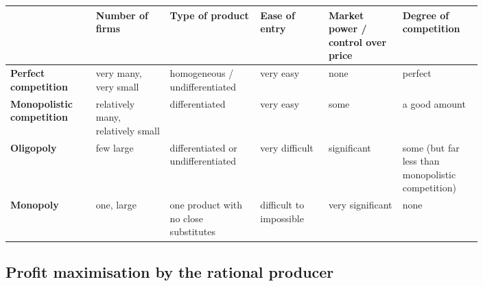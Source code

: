 \documentclass[a4paper,12pt]{article}
\begin{document}
\begin{center}
\renewcommand{\arraystretch}{1.6}
\begin{tabular}{|p{0.14\linewidth}|p{0.13\linewidth}|p{0.15\linewidth}|p{0.12\linewidth}|p{0.13\linewidth}|p{0.13\linewidth}|}
\hline
 & \textbf{Number of firms} & \textbf{Type of product} & \textbf{Ease of entry} & \textbf{Market power / control over price} & \textbf{Degree of competition} \\
\hline
\textbf{Perfect competition} & very many, very small & homogeneous / undifferentiated & very easy & none & perfect \\
\hline
\textbf{Monopolistic competition} & relatively many, relatively small & differentiated & very easy & some & a good amount \\
\hline
\textbf{Oligopoly} & few large & differentiated or undifferentiated & very difficult & significant & some (but far less than monopolistic competition) \\
\hline
\textbf{Monopoly} & one, large & one product with no close substitutes & difficult to impossible & very significant & none \\
\hline
\end{tabular}
\end{center}
\subsection{Profit maximisation by the rational producer}
\end{document}
